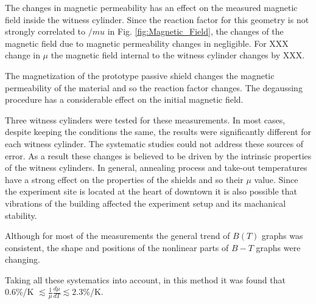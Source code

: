 \documentclass[review]{elsarticle}
\begin{document}
The changes in magnetic permeability has an effect on the measured magnetic field inside the witness cylinder. Since the reaction factor for this geometry is not strongly correlated to $/mu$ in Fig. \ref{fig:Magnetic_Field}, the changes of the magnetic field due to magnetic permeability changes in negligible. For XXX change in $\mu$ the magnetic field internal to the witness cylinder changes by XXX. 

The magnetization of the prototype passive shield changes the magnetic permeability of the material and so the reaction factor changes. The degaussing procedure has a considerable effect on the initial magnetic field.

Three witness cylinders were tested for these measurements. In most cases, despite keeping the conditions the same, the results were significantly different for each witness cylinder. The systematic studies could not address these sources of error. As a result these changes is believed to be driven by the intrinsic properties of the witness cylinders.   
In general, annealing process and take-out temperatures have a strong effect on the properties of the shields and so their $\mu$ value.
Since the experiment site is located at the heart of downtown it is also possible that vibrations of the building affected the experiment setup and its machanical stability.

Although for most of the measurements the general trend of $B(T)$ graphs was consistent, the shape and positions of the nonlinear parts of $B-T$ graphs were changing.







Taking all these systematics into account, in this method it was found that 0.6\%/K
$\lesssim\frac{1}{\mu}\frac{d\mu}{dT}\lesssim 2.3\%$/K. 



\end{document}
